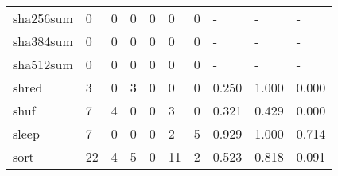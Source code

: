 \begin{longtable}{lp{1.3cm}p{1.3cm}p{1.3cm}p{1.3cm}p{1.3cm}p{1.3cm}p{1.3cm}p{1.3cm}p{1.3cm}}
sha256sum &                      0 &                                  0 &                                 0 &                                0 &                                 0 &                               0 &                                    - &                                      - &                                    - \\
sha384sum &                      0 &                                  0 &                                 0 &                                0 &                                 0 &                               0 &                                    - &                                      - &                                    - \\
sha512sum &                      0 &                                  0 &                                 0 &                                0 &                                 0 &                               0 &                                    - &                                      - &                                    - \\
shred     &                      3 &                                  0 &                                 3 &                                0 &                                 0 &                               0 &                                0.250 &                                  1.000 &                                0.000 \\
shuf      &                      7 &                                  4 &                                 0 &                                0 &                                 3 &                               0 &                                0.321 &                                  0.429 &                                0.000 \\
sleep     &                      7 &                                  0 &                                 0 &                                0 &                                 2 &                               5 &                                0.929 &                                  1.000 &                                0.714 \\
sort      &                     22 &                                  4 &                                 5 &                                0 &                                11 &                               2 &                                0.523 &                                  0.818 &                                0.091 \\

\end{longtable}
